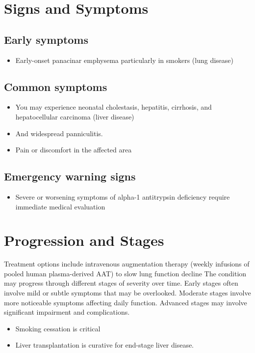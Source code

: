 \section{Signs and Symptoms}
\subsection{Early symptoms}
\begin{itemize}[noitemsep]
  \item Early-onset panacinar emphysema particularly in smokers (lung disease)
\end{itemize}
\subsection{Common symptoms}
\begin{itemize}[noitemsep]
  \item You may experience neonatal cholestasis, hepatitis, cirrhosis, and hepatocellular carcinoma (liver disease)
  \item And widespread panniculitis.
  \item Pain or discomfort in the affected area
  \end{itemize}
\subsection{Emergency warning signs}
\begin{itemize}[noitemsep]
  \item Severe or worsening symptoms of alpha-1 antitrypsin deficiency require immediate medical evaluation
\end{itemize}
\section{Progression and Stages}
Treatment options include intravenous augmentation therapy (weekly infusions of pooled human plasma-derived AAT) to slow lung function decline The condition may progress through different stages of severity over time. Early stages often involve mild or subtle symptoms that may be overlooked. Moderate stages involve more noticeable symptoms affecting daily function. Advanced stages may involve significant impairment and complications.

\begin{itemize}[noitemsep]
  \item Smoking cessation is critical
  \item Liver transplantation is curative for end-stage liver disease.
\end{itemize}
